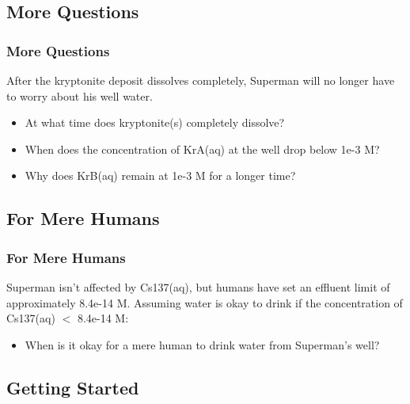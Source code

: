 \documentclass{beamer}
\newcommand\greencomment[1]{{{\color{green} #1}}}
\begin{document}
\subsection{More Questions}

\begin{frame}[fragile]\frametitle{More Questions}
After the kryptonite deposit dissolves completely, Superman will no longer have to worry about his well water.

\begin{itemize}
  \item At what time does \greencomment{kryptonite(s)} completely dissolve?
  \item When does the concentration of \greencomment{KrA(aq)} at the well drop below 1e-3 M?
  \item Why does \greencomment{KrB(aq)} remain at 1e-3 M for a longer time?
\end{itemize}

\end{frame}

\subsection{For Mere Humans}

\begin{frame}[fragile]\frametitle{For Mere Humans}
Superman isn't affected by \greencomment{Cs137(aq)}, but humans have set an effluent limit of approximately 8.4e-14 M. Assuming water is okay to drink if the concentration of \greencomment{Cs137(aq)} $<$ 8.4e-14 M:

\begin{itemize}
  \item When is it okay for a mere human to drink water from Superman's well?
\end{itemize}

\end{frame}

\subsection{Getting Started}
\end{document}
